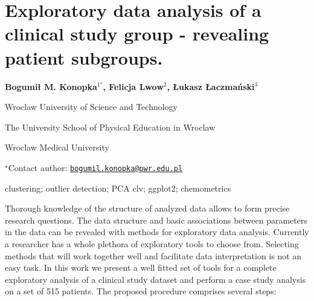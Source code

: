 \documentclass[\main/boa.tex]{subfiles}
\begin{document}
\section{Exploratory data analysis of a clinical study group - revealing patient
subgroups.}

\begin{center}
  {\bf {} Bogumił M. Konopka$^{1^\star}$,  Felicja Lwow$^{2}$,  Łukasz Łaczmański$^{3}$}
\end{center}

\vskip 0.3cm

\begin{affiliations}
\begin{enumerate}
\begin{minipage}{0.915\textwidth}
\centering
\item Wroclaw University of Science and Technology \\[-2pt]
\item The University School of Physical Education in Wroclaw \\[-2pt]
\item Wroclaw Medical University \\[-2pt]
\end{minipage}
\end{enumerate}
$^\star$Contact author: \href{mailto:bogumil.konopka@pwr.edu.pl}{\nolinkurl{bogumil.konopka@pwr.edu.pl}}\\
\end{affiliations}

\vskip 0.5cm

\begin{minipage}{0.915\textwidth}
\keywords clustering; outlier detection; PCA
\packages {} clv;  ggplot2;  chemometrics
\end{minipage}

\vskip 0.8cm

Thorough knowledge of the structure of analyzed data allows to form
precise research questions. The data structure and basic associations
between parameters in the data can be revealed with methods for
exploratory data analysis. Currently a researcher has a whole plethora
of exploratory tools to choose from. Selecting methods that will work
together well and facilitate data interpretation is not an easy task. In
this work we present a well fitted set of tools for a complete
exploratory analysis of a clinical study dataset and perform a case
study analysis on a set of 515 patients. The proposed procedure
comprises several steps:
\end{document}
